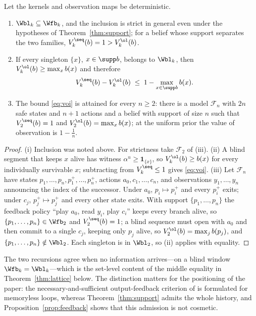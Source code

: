 \begin{proposition}\label{prop:feedback}
Let the kernels and observation maps be deterministic.
\begin{enumerate}[leftmargin=1.6em,itemsep=1pt]
\item[(i)] $\Wbl_k\subseteq\Wfb_k$, and the inclusion is strict in general even under the hypotheses of Theorem~\ref{thm:support}; for a belief whose support separates the two families, $V^{\seq}_k(b)=1>V^{\ol}_k(b)$.
\item[(ii)] If every singleton $\{x\}$, $x\in\supp b$, belongs to $\Wbl_k$, then $V^{\ol}_k(b)\ge\max_{x}b(x)$ and therefore
\begin{equation}\label{eq:voi}
V^{\seq}_k(b)-V^{\ol}_k(b)\;\le\;1-\max_{x\in\supp b}b(x).
\end{equation}
\item[(iii)] The bound \eqref{eq:voi} is attained for every $n\ge2$: there is a model $\mathcal F_n$ with $2n$ safe states and $n+1$ actions and a belief with support of size $n$ such that $V^{\seq}_2(b)=1$ and $V^{\ol}_2(b)=\max_x b(x)$; at the uniform prior the value of observation is $1-\tfrac1n$.
\end{enumerate}
\end{proposition}

\begin{proof}
(i) Inclusion was noted above. For strictness take $\mathcal F_2$ of (iii). (ii) A blind segment that keeps $x$ alive has witness $\alpha^u\ge\mathbf 1_{\{x\}}$, so $V^{\ol}_k(b)\ge b(x)$ for every individually survivable $x$; subtracting from $V^{\seq}_k\le1$ gives \eqref{eq:voi}. (iii) Let $\mathcal F_n$ have states $p_1,\dots,p_n,p_1^+,\dots,p_n^+$, actions $a_0,c_1,\dots,c_n$, and observations $y_1,\dots,y_n$ announcing the index of the successor. Under $a_0$, $p_i\mapsto p_i^+$ and every $p_i^+$ exits; under $c_j$, $p_j^+\mapsto p_j^+$ and every other state exits. With support $\{p_1,\dots,p_n\}$ the feedback policy ``play $a_0$, read $y_i$, play $c_i$'' keeps every branch alive, so $\{p_1,\dots,p_n\}\in\Wfb_2$ and $V^{\seq}_2(b)=1$; a blind sequence must open with $a_0$ and then commit to a single $c_j$, keeping only $p_j$ alive, so $V^{\ol}_2(b)=\max_j b(p_j)$, and $\{p_1,\dots,p_n\}\notin\Wbl_2$. Each singleton is in $\Wbl_2$, so (ii) applies with equality.
\end{proof}

The two recursions agree when no information arrives---on a blind window $\Wfb_k=\Wbl_k$---which is the set-level content of the middle equality in Theorem~\ref{thm:lattice} below. The distinction matters for the positioning of the paper: the necessary-and-sufficient output-feedback criterion of \cite{Doyen2000} is formulated for memoryless loops, whereas Theorem~\ref{thm:support} admits the whole history, and Proposition~\ref{prop:feedback} shows that this admission is not cosmetic.

